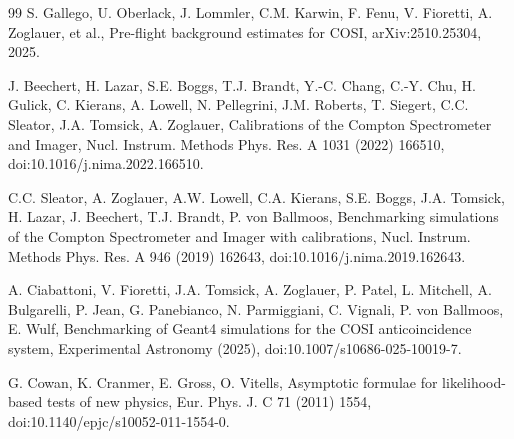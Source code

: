\documentclass[11pt]{article}
\begin{document}
\begin{thebibliography}{99}
S. Gallego, U. Oberlack, J. Lommler, C.M. Karwin, F. Fenu, V. Fioretti, A. Zoglauer, et al., Pre-flight background estimates for COSI, arXiv:2510.25304, 2025.

J. Beechert, H. Lazar, S.E. Boggs, T.J. Brandt, Y.-C. Chang, C.-Y. Chu, H. Gulick, C. Kierans, A. Lowell, N. Pellegrini, J.M. Roberts, T. Siegert, C.C. Sleator, J.A. Tomsick, A. Zoglauer, Calibrations of the Compton Spectrometer and Imager, Nucl. Instrum. Methods Phys. Res. A 1031 (2022) 166510, doi:10.1016/j.nima.2022.166510.

C.C. Sleator, A. Zoglauer, A.W. Lowell, C.A. Kierans, S.E. Boggs, J.A. Tomsick, H. Lazar, J. Beechert, T.J. Brandt, P. von Ballmoos, Benchmarking simulations of the Compton Spectrometer and Imager with calibrations, Nucl. Instrum. Methods Phys. Res. A 946 (2019) 162643, doi:10.1016/j.nima.2019.162643.

A. Ciabattoni, V. Fioretti, J.A. Tomsick, A. Zoglauer, P. Patel, L. Mitchell, A. Bulgarelli, P. Jean, G. Panebianco, N. Parmiggiani, C. Vignali, P. von Ballmoos, E. Wulf, Benchmarking of Geant4 simulations for the COSI anticoincidence system, Experimental Astronomy (2025), doi:10.1007/s10686-025-10019-7.

G. Cowan, K. Cranmer, E. Gross, O. Vitells, Asymptotic formulae for likelihood-based tests of new physics, Eur. Phys. J. C 71 (2011) 1554, doi:10.1140/epjc/s10052-011-1554-0.

\end{thebibliography}
\end{document}
